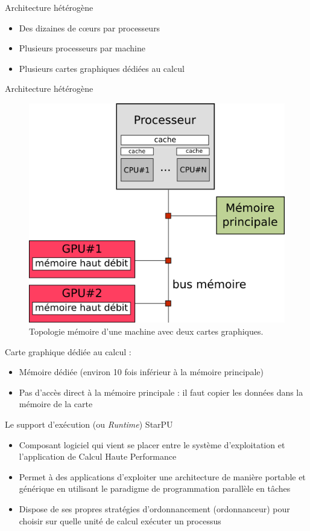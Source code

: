 \documentclass[9pt]{beamer}
\begin{document}
\begin{frame}{Architecture hétérogène}
  \vfill
  \begin{itemize}
  \item<1-> Des dizaines de cœurs par processeurs
    \vfill
  \item<2-> Plusieurs processeurs par machine
    \vfill
  \item<3-> Plusieurs cartes graphiques dédiées au calcul
  \end{itemize}
  \vfill
\end{frame}
\begin{frame}{Architecture hétérogène}
  \begin{figure}
    \centering
    \includegraphics[width=0.5\linewidth]{img/memarch.png}
    \caption{Topologie mémoire d'une machine avec deux cartes graphiques.}
  \end{figure}
  \vfill
  Carte graphique dédiée au calcul :
  \vfill
  \begin{itemize}
  \item<2-> Mémoire dédiée (environ 10 fois inférieur à la mémoire principale)
    \vfill
  \item<3-> Pas d'accès direct à la mémoire principale : il faut copier les
    données dans la mémoire de la carte
  \end{itemize}
\end{frame}

\begin{frame}{Le support d'exécution (ou \textit{Runtime}) StarPU}
  \vfill
  \begin{itemize}
  \item Composant logiciel qui vient se placer entre le système d'exploitation
    et l'application de Calcul Haute Performance
    \vfill
  \item Permet à des applications d'exploiter une architecture de manière portable et générique
    en utilisant le paradigme de programmation parallèle en tâches
    \vfill
  \item Dispose de ses propres stratégies d'ordonnancement (ordonnanceur) pour
    choisir sur quelle unité de calcul exécuter un processus
  \end{itemize}
  \vfill
\end{frame}
\end{document}

